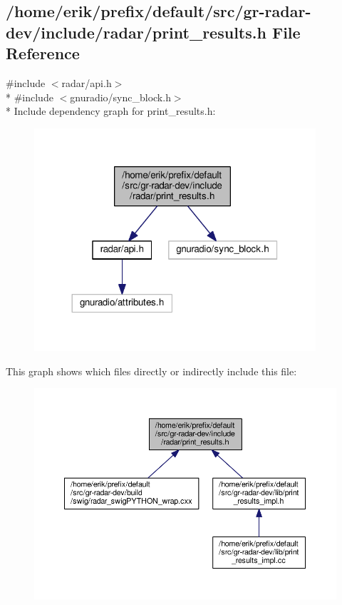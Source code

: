 \subsection{/home/erik/prefix/default/src/gr-\/radar-\/dev/include/radar/print\+\_\+results.h File Reference}
\label{print__results_8h}
{\ttfamily \#include $<$radar/api.\+h$>$}\\*
{\ttfamily \#include $<$gnuradio/sync\+\_\+block.\+h$>$}\\*
Include dependency graph for print\+\_\+results.\+h\+:
\nopagebreak
\begin{figure}[H]
\begin{center}
\leavevmode
\includegraphics[width=296pt]{de/d3e/print__results_8h__incl}
\end{center}
\end{figure}
This graph shows which files directly or indirectly include this file\+:
\nopagebreak
\begin{figure}[H]
\begin{center}
\leavevmode
\includegraphics[width=350pt]{da/dda/print__results_8h__dep__incl}
\end{center}
\end{figure}
